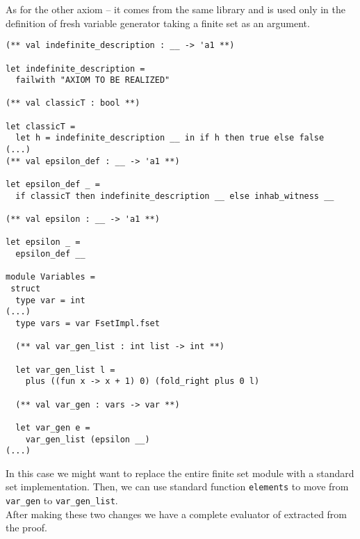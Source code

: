 As for the other axiom -- it comes from the same \tlc{} library and is used only in the definition of fresh variable generator taking a finite set as an argument. 
\begin{verbatim}
(** val indefinite_description : __ -> 'a1 **)

let indefinite_description =
  failwith "AXIOM TO BE REALIZED"

(** val classicT : bool **)

let classicT =
  let h = indefinite_description __ in if h then true else false
(...)
(** val epsilon_def : __ -> 'a1 **)

let epsilon_def _ =
  if classicT then indefinite_description __ else inhab_witness __

(** val epsilon : __ -> 'a1 **)

let epsilon _ =
  epsilon_def __

module Variables = 
 struct 
  type var = int
(...)
  type vars = var FsetImpl.fset
  
  (** val var_gen_list : int list -> int **)
  
  let var_gen_list l =
    plus ((fun x -> x + 1) 0) (fold_right plus 0 l)
  
  (** val var_gen : vars -> var **)
  
  let var_gen e =
    var_gen_list (epsilon __)
(...)
\end{verbatim}
In this case we might want to replace the entire finite set module with a standard set implementation. Then, we can use standard function \verb|elements| to move from \verb|var_gen| to \verb|var_gen_list|.\\

After making these two changes we have a complete evaluator of \nodiaLangLF{} extracted from the proof.